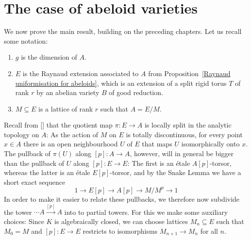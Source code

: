 \documentclass[10pt,oneside]{amsart}
\theoremstyle{definition}
\begin{document}
	\section{The case of abeloid varieties}\label{The case of abeloid varieties}
	We now prove the main result, building on the preceding chapters. Let us recall some notation:

\begin{enumerate} 
\item  $g$ is the dimension of $A$. 
\item  $E$ is the Raynaud extension associated to $A$ from Proposition~\ref{Raynaud uniformisation for abeloids}, which is an extension of a split rigid torus $T$ of rank $r$ by an abelian variety $B$ of good reduction. 
\item $M\subseteq E$  is a lattice of rank $r$ such that $A=E/M$. 
\end{enumerate}

Recall from [] that the quotient map $\pi:E\to A$ is locally split in the analytic topology on $A$: As the action of $M$ on $E$ is totally discontinuous, for every point  $x\in A$ there is an open neighbourhood $U$ of $E$ that maps $U$ isomorphically onto $x$.
The pullback of $\pi(U)$ along $[p]:A\to A$, however, will in general be bigger than the pullback of $U$ along $[p]:E\to E$: The first is an \'etale $A[p]$-torsor, whereas  the latter is an \'etale $E[p]$-torsor, and by the Snake Lemma we have a short exact sequence
\[1\to E[p]\to A[p]\to M/M^p\to 1\]
In order to make it easier to relate these pullbacks, we therefore now subdivide the tower $\cdots A\xrightarrow{[p]}A$ into to partial towers. For this we make some auxiliary choices: Since $K$ is algebraically closed, we can choose lattices $M_n\subseteq E$ such that $M_0=M$ and $[p]:E\rightarrow E$ restricts to isomorphisms $M_{n+1}\rightarrow M_n$ for all $n$.
	
\end{document}

